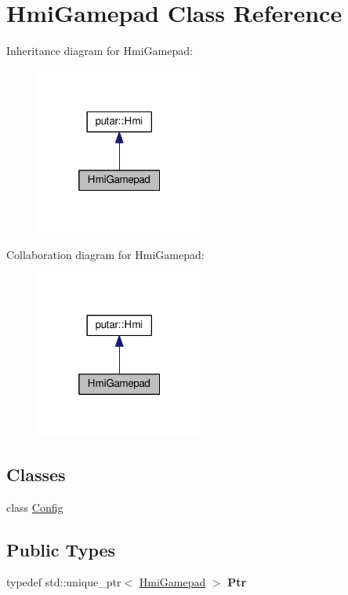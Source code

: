 \hypertarget{classHmiGamepad}{}\section{Hmi\+Gamepad Class Reference}
\label{classHmiGamepad}


Inheritance diagram for Hmi\+Gamepad\+:
\nopagebreak
\begin{figure}[H]
\begin{center}
\leavevmode
\includegraphics[width=157pt]{classHmiGamepad__inherit__graph}
\end{center}
\end{figure}


Collaboration diagram for Hmi\+Gamepad\+:
\nopagebreak
\begin{figure}[H]
\begin{center}
\leavevmode
\includegraphics[width=157pt]{classHmiGamepad__coll__graph}
\end{center}
\end{figure}
\subsection*{Classes}
\begin{DoxyCompactItemize}
\item 
class \hyperlink{classHmiGamepad_1_1Config}{Config}
\end{DoxyCompactItemize}
\subsection*{Public Types}
\begin{DoxyCompactItemize}
\item 
typedef std\+::unique\+\_\+ptr$<$ \hyperlink{classHmiGamepad}{Hmi\+Gamepad} $>$ {\bfseries Ptr}\hypertarget{classHmiGamepad_a5201dddd045aaa96c7d58376c623f2cd}{}\label{classHmiGamepad_a5201dddd045aaa96c7d58376c623f2cd}

\end{DoxyCompactItemize}
